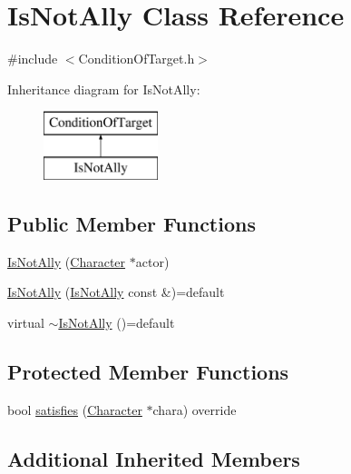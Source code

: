 \hypertarget{class_is_not_ally}{}\section{Is\+Not\+Ally Class Reference}
\label{class_is_not_ally}


{\ttfamily \#include $<$Condition\+Of\+Target.\+h$>$}

Inheritance diagram for Is\+Not\+Ally\+:\begin{figure}[H]
\begin{center}
\leavevmode
\includegraphics[height=2.000000cm]{class_is_not_ally}
\end{center}
\end{figure}
\subsection*{Public Member Functions}
\begin{DoxyCompactItemize}
\item 
\hyperlink{class_is_not_ally_addc31b0d4c8882fecdee1f6c538b6c53}{Is\+Not\+Ally} (\hyperlink{class_character}{Character} $\ast$actor)
\item 
\hyperlink{class_is_not_ally_ab6199178430694d961ec6549ff4d6124}{Is\+Not\+Ally} (\hyperlink{class_is_not_ally}{Is\+Not\+Ally} const \&)=default
\item 
virtual \hyperlink{class_is_not_ally_a15f461560f0988fb08ef1b2480743874}{$\sim$\+Is\+Not\+Ally} ()=default
\end{DoxyCompactItemize}
\subsection*{Protected Member Functions}
\begin{DoxyCompactItemize}
\item 
bool \hyperlink{class_is_not_ally_a68d6f654a0ff96e60c4b3616c0b932f2}{satisfies} (\hyperlink{class_character}{Character} $\ast$chara) override
\end{DoxyCompactItemize}
\subsection*{Additional Inherited Members}


